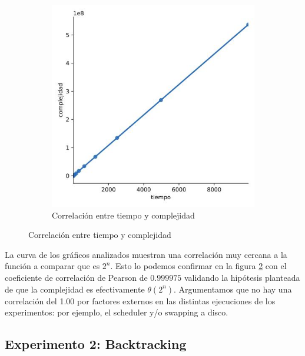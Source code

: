 \documentclass[10pt,a4paper]{article}
\begin{document}
\begin{figure}[h!]
	\centering
	\begin{subfigure}{0.4\linewidth}
		\centering
			\includegraphics[scale=0.3]{img/fb-correlacion.jpg}
			\caption{Correlación entre tiempo y complejidad}
			\label{fig:fb-correlacion}
	\end{subfigure}	
\end{figure}
\newline
La curva de los gráficos analizados muestran una correlación muy cercana a la función a comparar que es $2^{n}$. Esto lo podemos confirmar en la figura \ref{fig:fb-correlacion} con el
coeficiente de correlación de Pearson\cite{ref:pearson} de $0.999975$ validando la hipótesis planteada de que la complejidad es efectivamente $\theta(2^n)$. Argumentamos que no hay una correlación del 1.00 por factores externos en las distintas ejecuciones de los experimentos: por ejemplo, el scheduler y/o swapping a disco.
\newpage
\subsection{Experimento 2: Backtracking}
\end{document}
